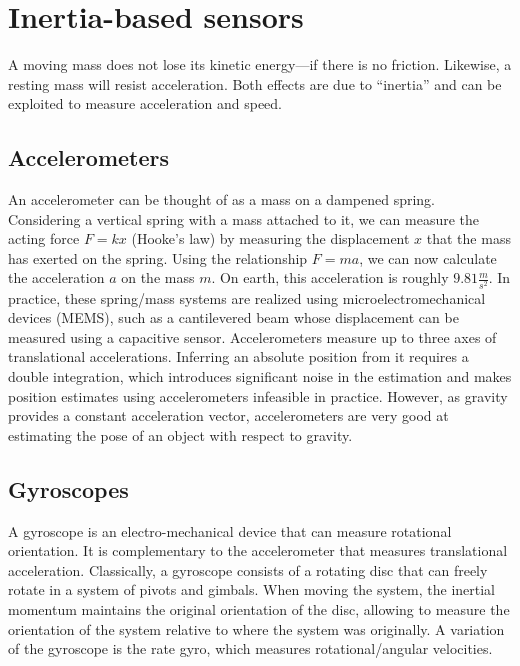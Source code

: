 \section{Inertia-based sensors}\label{sec:sensors:inertia}

A moving mass does not lose its kinetic energy---if there is no friction. Likewise, a resting mass will resist acceleration. Both effects are due to ``inertia''  and can be exploited to measure acceleration and speed.

\subsection{Accelerometers}

An accelerometer can be thought of as a mass on a dampened spring. Considering a vertical spring with a mass attached to it, we can measure the acting force $F=kx$ (Hooke's law) by measuring the displacement $x$ that the mass has exerted on the spring.
Using the relationship $F=ma$, we can now calculate the acceleration $a$ on the mass $m$. On earth, this acceleration is roughly $9.81\frac{m}{s^2}$.
In practice, these spring/mass systems are realized using microelectromechanical devices (MEMS), such as a cantilevered beam whose displacement can be measured using a capacitive sensor. Accelerometers measure up to three axes of translational accelerations. Inferring an absolute position from it requires a double integration, which introduces significant noise in the estimation and makes position estimates using accelerometers infeasible in practice.
However, as gravity provides a constant acceleration vector, accelerometers are very good at estimating the pose of an object with respect to gravity.

\subsection{Gyroscopes}\label{sec:gyroscopes}

A gyroscope is an electro-mechanical device that can measure rotational orientation. It is complementary to the accelerometer that measures translational acceleration. Classically, a gyroscope consists of a rotating disc that can freely rotate in a system of pivots and gimbals. When moving the system, the inertial momentum maintains the original orientation of the disc, allowing to measure the orientation of the system relative to where the system was originally. A variation of the gyroscope is the rate gyro, which measures rotational/angular velocities.

